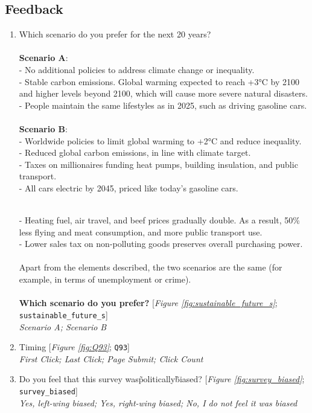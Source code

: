  \subsection*{Feedback} 
 \begin{enumerate}[resume] 
\item  \label{q:sustainable_future_s} Which scenario do you prefer for the next 20 years?\\\\\textbf{Scenario A}:\\- No additional policies to address climate change or inequality.\~\\- Stable carbon emissions. Global warming expected to reach +3°C by 2100 and higher levels beyond 2100, which will cause more severe natural disasters.\\- People maintain the same lifestyles as in 2025, such as driving gasoline cars.\\\\\textbf{Scenario B}: \\- Worldwide policies to limit global warming to +2°C and reduce inequality. \\- Reduced global carbon emissions, in line with climate target. \\- Taxes on millionaires funding heat pumps, building insulation, and public transport. \\- All cars electric by 2045, priced like today's gasoline cars.

\\- Heating fuel, air travel, and beef prices gradually double. As a result, 50\% less flying and meat consumption, and more public transport use. \\- Lower sales tax on non-polluting goods preserves overall purchasing power.\\\\Apart from the elements described, the two scenarios are the same (for example, in terms of unemployment or crime). \\\\\textbf{Which scenario do you prefer?} [\textit{Figure \ref{fig:sustainable_future_s}}; 
\verb|sustainable_future_s|]
  \\ \textit{Scenario A; Scenario B}

\item  \label{q:Q93} Timing [\textit{Figure \ref{fig:Q93}}; 
\verb|Q93|]
  \\ \textit{First Click; Last Click; Page Submit; Click Count}

\item  \label{q:survey_biased} Do you feel that this survey was\~politically\~biased? [\textit{Figure \ref{fig:survey_biased}}; 
\verb|survey_biased|]
  \\ \textit{Yes, left-wing biased; Yes, right-wing biased; No, I do not feel it was biased}


\end{enumerate}
